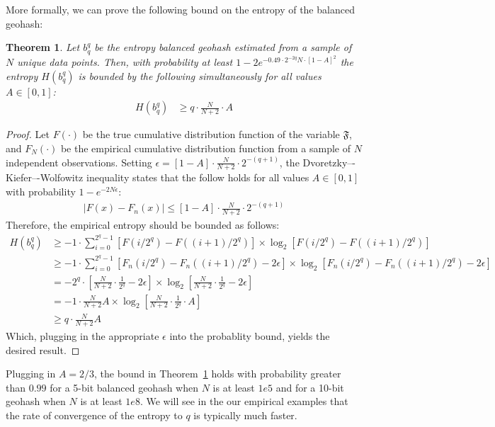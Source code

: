 \documentclass[nips13submit_09,times,art10]{article} %
\newtheorem{thm}{Theorem}
\begin{document}
More formally, we can prove the following bound on the entropy of the balanced geohash:
\begin{thm} \label{entropyThm}
Let $b_q^q$ be the entropy balanced geohash estimated from a sample of $N$ unique data points. Then,
with probability at least $1 - 2 e^{-0.49 \cdot 2^{-2q} N \cdot [1 - A]^2}$ the entropy
$H(b_q^q)$ is bounded by the following simultaneously for all values $A \in [0,1]$:
\begin{align}
H(b_q^q) &\geq q \cdot \frac{N}{N+2} \cdot A
\end{align}
\end{thm}
\begin{proof}
Let $F(\cdot)$ be the true cumulative distribution function of the variable $\mathfrak{F}$,
and $F_N(\cdot)$ be the empirical cumulative distribution function from a sample of $N$
independent observations. Setting $\epsilon = [1 - A] \cdot \frac{N}{N+2} \cdot 2^{-(q+1)}$,
the Dvoretzky–-Kiefer–-Wolfowitz inequality states \cite{dvoretzky1956asymptotic} that
the follow holds for all values
$A \in [0,1]$ with probability $1 - e^{-2N\epsilon}$:
\begin{align}
|F(x) - F_n(x)| \leq [1 - A] \cdot \frac{N}{N+2} \cdot 2^{-(q+1)}
\end{align}
Therefore, the empirical entropy should be bounded as follows:
\begin{align}
H(b_q^q) &\geq -1 \cdot \sum_{i=0}^{2^q-1} \left[F(i/2^q) - F((i+1)/2^q)\right] \times
  \log_2 \left[F(i/2^q) - F((i+1)/2^q)\right] \\
&\geq -1 \cdot \sum_{i=0}^{2^q-1} \left[F_n(i/2^q) - F_n((i+1)/2^q) - 2\epsilon \right] \times
  \log_2 \left[F_n(i/2^q) - F_n((i+1)/2^q) - 2\epsilon \right] \\
&= -2^{q} \cdot \left[\frac{N}{N+2} \cdot \frac{1}{2^q} - 2 \epsilon \right] \times
  \log_2 \left[\frac{N}{N+2} \cdot \frac{1}{2^q} - 2 \epsilon  \right] \\
&= -1 \cdot \frac{N}{N+2} A \times \log_2 \left[\frac{N}{N+2} \cdot \frac{1}{2^q} \cdot A  \right] \\
&\geq q \cdot \frac{N}{N+2} A
\end{align}
Which, plugging in the appropriate $\epsilon$ into the probablity bound, yields the desired result.
\end{proof}
Plugging in $A=2/3$, the bound in Theorem~\ref{entropyThm} holds with probability greater than $0.99$
for a 5-bit balanced geohash when $N$ is at least $1e5$ and for a 10-bit geohash when $N$ is at
least $1e8$. We will see in the our empirical examples that the rate of convergence of the entropy
to $q$ is typically much faster.
\end{document}

